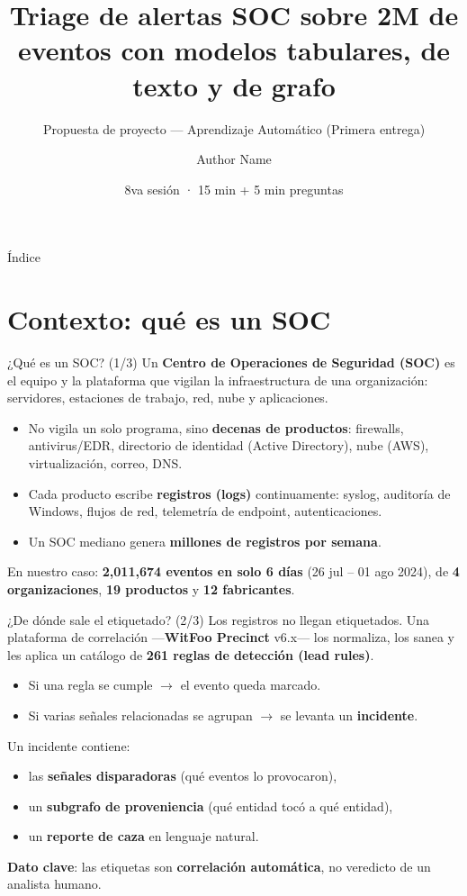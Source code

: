 \documentclass[aspectratio=169,10pt]{beamer}
\title{Triage de alertas SOC sobre 2M de eventos con modelos tabulares, de texto y de grafo}
\subtitle{Propuesta de proyecto — Aprendizaje Automático (Primera entrega)}
\author{Author Name}
\date{8va sesión · 15 min + 5 min preguntas}
\begin{document}
\frame{\titlepage}

\begin{frame}{Índice}
\tableofcontents
\end{frame}

\section{Contexto: qué es un SOC}
\begin{frame}{¿Qué es un SOC? (1/3)}
Un \textbf{Centro de Operaciones de Seguridad (SOC)} es el equipo y la plataforma que vigilan la infraestructura de una organización: servidores, estaciones de trabajo, red, nube y aplicaciones.

\begin{itemize}
\item No vigila un solo programa, sino \textbf{decenas de productos}: firewalls, antivirus/EDR, directorio de identidad (Active Directory), nube (AWS), virtualización, correo, DNS.
\item Cada producto escribe \textbf{registros (logs)} continuamente: syslog, auditoría de Windows, flujos de red, telemetría de endpoint, autenticaciones.
\item Un SOC mediano genera \textbf{millones de registros por semana}.
\end{itemize}

En nuestro caso: \textbf{2,011,674 eventos en solo 6 días} (26 jul -- 01 ago 2024), de \textbf{4 organizaciones}, \textbf{19 productos} y \textbf{12 fabricantes}.
\end{frame}

\begin{frame}{¿De dónde sale el etiquetado? (2/3)}
Los registros no llegan etiquetados. Una plataforma de correlación —\textbf{WitFoo Precinct} v6.x— los normaliza, los sanea y les aplica un catálogo de \textbf{261 reglas de detección (lead rules)}.

\begin{itemize}
\item Si una regla se cumple $\to$ el evento queda marcado.
\item Si varias se\~nales relacionadas se agrupan $\to$ se levanta un \textbf{incidente}.
\end{itemize}

Un incidente contiene:
\begin{itemize}
\item las \textbf{se\~nales disparadoras} (qué eventos lo provocaron),
\item un \textbf{subgrafo de proveniencia} (qué entidad tocó a qué entidad),
\item un \textbf{reporte de caza} en lenguaje natural.
\end{itemize}

\textbf{Dato clave}: las etiquetas son \textbf{correlación automática}, no veredicto de un analista humano.
\end{frame}
\end{document}
